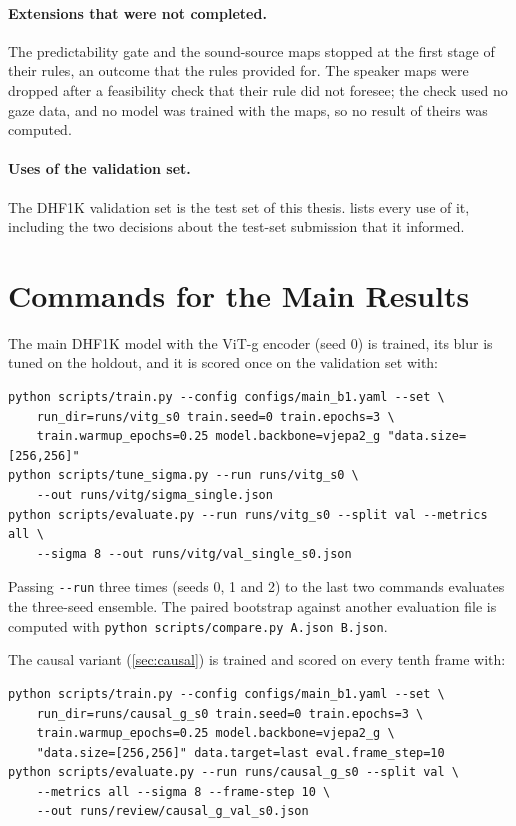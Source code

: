 \paragraph{Extensions that were not completed.} The predictability gate and
the sound-source maps stopped at the first stage of their rules, an outcome
that the rules provided for. The speaker maps were dropped after a feasibility
check that their rule did not foresee; the check used no gaze data, and no
model was trained with the maps, so no result of theirs was computed.

\paragraph{Uses of the validation set.} The DHF1K validation set is the test
set of this thesis.  lists every use of it, including
the two decisions about the test-set submission that it informed.

\section{Commands for the Main Results}

The main DHF1K model with the \acrshort{ViT}-g encoder (seed 0) is trained, its blur is
tuned on the holdout, and it is scored once on the validation set with:

\begin{small}
\begin{verbatim}
python scripts/train.py --config configs/main_b1.yaml --set \
    run_dir=runs/vitg_s0 train.seed=0 train.epochs=3 \
    train.warmup_epochs=0.25 model.backbone=vjepa2_g "data.size=[256,256]"
python scripts/tune_sigma.py --run runs/vitg_s0 \
    --out runs/vitg/sigma_single.json
python scripts/evaluate.py --run runs/vitg_s0 --split val --metrics all \
    --sigma 8 --out runs/vitg/val_single_s0.json
\end{verbatim}
\end{small}

Passing \verb|--run| three times (seeds 0, 1 and 2) to the last two commands
evaluates the three-seed ensemble. The paired bootstrap against another
evaluation file is computed with \verb|python scripts/compare.py A.json B.json|.

The causal variant (\cref{sec:causal}) is trained and scored on every tenth
frame with:

\begin{small}
\begin{verbatim}
python scripts/train.py --config configs/main_b1.yaml --set \
    run_dir=runs/causal_g_s0 train.seed=0 train.epochs=3 \
    train.warmup_epochs=0.25 model.backbone=vjepa2_g \
    "data.size=[256,256]" data.target=last eval.frame_step=10
python scripts/evaluate.py --run runs/causal_g_s0 --split val \
    --metrics all --sigma 8 --frame-step 10 \
    --out runs/review/causal_g_val_s0.json
\end{verbatim}
\end{small}

